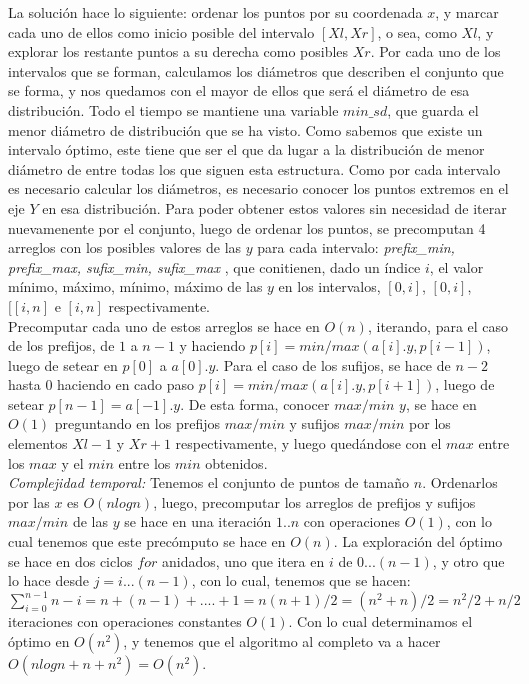 \documentclass{article}
\begin{document}
La soluci\'on hace lo siguiente: ordenar los puntos por su coordenada $x$, y marcar cada uno de ellos como inicio posible del intervalo $[Xl,Xr]$, o sea, como $Xl$, y explorar los restante puntos a su derecha como posibles $Xr$. Por cada uno de los intervalos que se forman, calculamos los di\'ametros que describen el conjunto que se forma, y nos quedamos con el mayor de ellos que ser\'a el di\'ametro de esa distribuci\'on. Todo el tiempo se mantiene una variable $min\_sd$, que guarda el menor di\'ametro de distribuci\'on que se ha visto. Como sabemos que existe un intervalo \'optimo, este tiene que ser el que da lugar a la distribuci\'on de menor di\'ametro de entre todas los que siguen esta estructura. Como por cada intervalo es necesario calcular los di\'ametros, es necesario conocer los puntos extremos en el eje $Y$ en esa distribuci\'on. Para poder obtener estos valores sin necesidad de iterar nuevamenente por el conjunto, luego de ordenar los puntos, se precomputan 4 arreglos con los posibles valores de las $y$ para cada intervalo: \textit{prefix\_min, prefix\_max, sufix\_min, sufix\_max} , que conitienen, dado un \'indice $i$, el valor m\'inimo, m\'aximo, m\'inimo, m\'aximo de las $y$ en los intervalos, $[0,i]$, $[0,i]$, $[[i,n]$ e $[i,n]$ respectivamente.\\
Precomputar cada uno de estos arreglos se hace en $O(n)$, iterando, para el caso de los prefijos, de $1$ a $n-1$ y haciendo $p[i] = min/max(a[i].y, p[i-1])$, luego de setear en $p[0]$ a $a[0].y$. Para el caso de los sufijos, se hace de $n-2$ hasta $0$ haciendo en cado paso $p[i]= min/max(a[i].y,p[i+1])$, luego de setear $p[n-1]=a[-1].y$. De esta forma, conocer $max/min$ $y$, se hace en $O(1)$ preguntando en los prefijos $max/min$ y sufijos $max/min$ por los elementos $Xl-1$ y $Xr+1$ respectivamente, y luego qued\'andose con el $max$ entre los $max$ y el $min$ entre  los $min$ obtenidos.\\

\textit{Complejidad temporal:} Tenemos el conjunto de puntos de tama\~no $n$. Ordenarlos por las $x$ es $O(nlogn)$, luego, precomputar los arreglos de prefijos y sufijos $max/min$ de las $y$ se hace en una iteraci\'on $1..n$ con operaciones $O(1)$, con lo cual tenemos que este prec\'omputo se hace en $O(n)$. La exploraci\'on del \'optimo se hace en dos ciclos $for$ anidados, uno que itera en $i$ de $0...(n-1)$, y otro que lo hace desde $j=i...(n-1)$, con lo cual, tenemos que se hacen:\\

$\sum_{i=0}^{n-1} n-i = n+(n-1)+....+1 = n(n+1)/2= (n^2+n)/2 = n^2/2+n/2$\\
iteraciones con operaciones constantes $O(1)$. Con lo cual determinamos el \'optimo en $O(n^2)$, y tenemos que el algoritmo al completo va a hacer $O(nlogn + n + n^2)=O(n^2)$.\\
\end{document}
